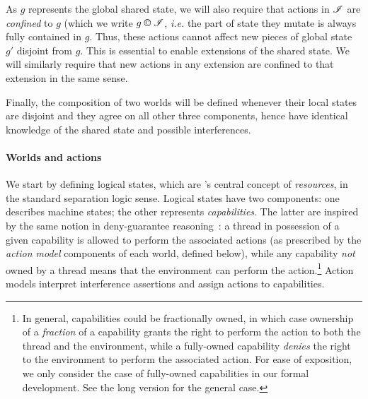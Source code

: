 As $g$ represents the global shared state, we will also require that
actions in $\mathscr{I}$ are \emph{confined} to $g$ (which we write $g
\containI \lmod$, \textit{i.e.} the part of state they mutate is
always fully contained in $g$. Thus, these actions cannot affect new
pieces of global state $g'$ disjoint from $g$. This is essential to
enable extensions of the shared state. We will similarly require that
new actions in any extension are confined to that extension in the
same sense.

Finally, the composition of two worlds will be defined whenever their
local states are disjoint and they agree on all other three
components, hence have identical knowledge of the shared state and
possible interferences.

\paragraph{Worlds and actions}
We start by defining logical states, which are \colosl's central
concept of \emph{resources}, in the standard separation logic
sense. Logical states have two components: one describes machine
states; the other represents \emph{capabilities}. The latter are
inspired by the same notion in deny-guarantee reasoning~\cite{dg}: a
thread in possession of a given capability is allowed to perform the
associated actions (as prescribed by the \emph{action model}
components of each world, defined below), while any capability
\emph{not} owned by a thread means that the environment can perform
the action.\footnote{In general, capabilities could be fractionally
  owned, in which case ownership of a \emph{fraction} of a capability
  grants the right to perform the action to both the thread and the
  environment, while a fully-owned capability \emph{denies} the right
  to the environment to perform the associated action. For ease of
  exposition, we only consider the case of fully-owned capabilities in
  our formal development. See the long version for the general case.}
Action models interpret interference assertions and assign actions to
capabilities.

